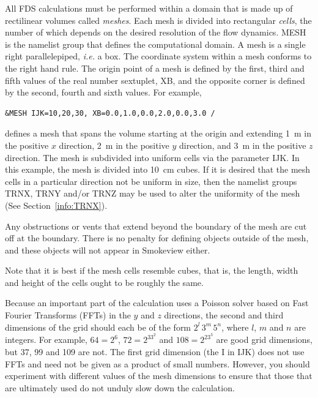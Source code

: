 \documentclass[11pt]{book}
\begin{document}
All FDS calculations must be performed within a domain that is made up
of rectilinear volumes called {\em meshes}. Each mesh is divided into rectangular {\em cells},
the number of which depends on the desired resolution of the flow dynamics.
{\ct MESH} is the namelist group that defines the computational domain.
A mesh is a single right parallelepiped, {\em i.e.} a box.
The coordinate system within a mesh conforms to the right hand rule.
The origin point of a mesh is defined by the first, third
and fifth values of the real number sextuplet, {\ct XB}, and the opposite
corner is defined by the second, fourth and sixth values.
For example,

\footnotesize
\begin{verbatim}
&MESH IJK=10,20,30, XB=0.0,1.0,0.0,2.0,0.0,3.0 /
\end{verbatim}

\normalsize
\noindent
defines a mesh that spans the volume starting at the origin and extending 1~m in the positive
$x$ direction, 2~m in the positive $y$ direction, and 3~m in the positive $z$ direction.
The mesh is subdivided into uniform cells via the parameter
{\ct IJK}. In this example, the mesh is divided into 10~cm cubes.
If it is desired that the mesh cells in a particular direction not be uniform in size,
then the namelist groups {\ct TRNX}, {\ct TRNY} and/or {\ct TRNZ} may be used to alter the
uniformity of the mesh (See Section~\ref{info:TRNX}).

Any obstructions or vents that extend beyond the boundary of the mesh
are cut off at the boundary. There is no penalty for defining objects
outside of the mesh, and these objects will not appear in Smokeview either.

\begin{warning}
\noindent
Note that it is best if the mesh cells resemble cubes, that is, the
length, width and height of the cells ought to be roughly the same.
\end{warning}

Because an important part of the calculation uses a Poisson solver based on
Fast Fourier Transforms (FFTs) in the $y$ and $z$ directions, the second and third dimensions
of the grid should each be of the form $2^l \, 3^m \, 5^n$, where
$l$, $m$ and $n$ are integers. For example,
$64=2^6$, $72=2^33^2$ and $108=2^23^3$ are good grid dimensions, but 37, 99 and 109 are not.
The first grid dimension (the {\ct I} in {\ct IJK})  does not use FFTs and need not be given as a
product of small numbers. However, you should experiment with different values of the mesh
dimensions to ensure that those that are ultimately used do not unduly slow down the calculation.
\end{document}
